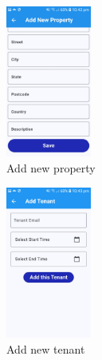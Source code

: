 \documentclass[sigconf,nonacm]{acmart}\settopmatter{printfolios=true}
\begin{document}
\begin{figure}[htbp]
  \centering
  \includegraphics[width=0.25\textwidth]{addNewProperty.jpg}
  \caption{Add new property}
  \label{fig:addNewProperty}
\end{figure}

\begin{figure}[htbp]
  \centering
  \includegraphics[width=0.25\textwidth]{addTenant.jpg}
  \caption{Add new tenant}
  \label{fig:addTenant}
\end{figure}
\end{document}
